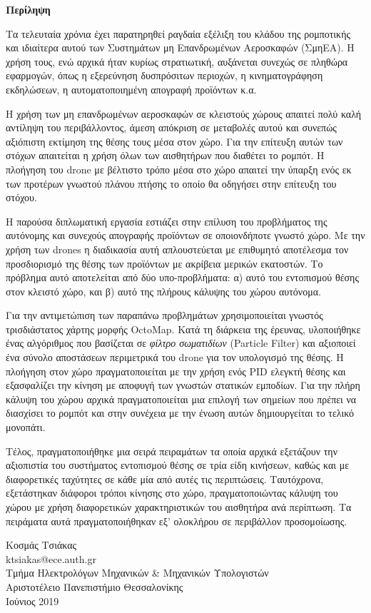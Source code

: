 \begin{center}
  \centering

  \vspace{0.5cm}
  \centering
  \textbf{\Large{Περίληψη}}

  \vspace{1cm}

\end{center}

Τα τελευταία χρόνια έχει παρατηρηθεί ραγδαία εξέλιξη του κλάδου της ρομποτικής και ιδιαίτερα αυτού των Συστημάτων μη Επανδρωμένων Αεροσκαφών (ΣμηΕΑ). Η χρήση τους, ενώ αρχικά ήταν κυρίως στρατιωτική, αυξάνεται συνεχώς σε πληθώρα εφαρμογών, όπως η εξερεύνηση δυσπρόσιτων περιοχών, η κινηματογράφηση εκδηλώσεων, η αυτοματοποιημένη απογραφή προϊόντων κ.α. 

Η χρήση των μη επανδρωμένων αεροσκαφών σε κλειστούς χώρους απαιτεί πολύ καλή αντίληψη του περιβάλλοντος, άμεση απόκριση σε μεταβολές αυτού και συνεπώς αξιόπιστη εκτίμηση της θέσης τους μέσα στον χώρο. Για την επίτευξη αυτών των στόχων απαιτείται η χρήση όλων των αισθητήρων που διαθέτει το ρομπότ. Η πλοήγηση του drone με βέλτιστο τρόπο μέσα στο χώρο απαιτεί την ύπαρξη ενός εκ των προτέρων γνωστού πλάνου πτήσης το οποίο θα οδηγήσει στην επίτευξη του στόχου.

Η παρούσα διπλωματική εργασία εστιάζει στην επίλυση του προβλήματος της αυτόνομης και συνεχούς απογραφής προϊόντων σε οποιονδήποτε γνωστό χώρο. Με την χρήση των drones η διαδικασία αυτή απλουστεύεται με επιθυμητό αποτέλεσμα τον προσδιορισμό της θέσης των προϊόντων με ακρίβεια μερικών εκατοστών. Το πρόβλημα αυτό αποτελείται από δύο υπο-προβλήματα: α) αυτό του εντοπισμού θέσης στον κλειστό χώρο, και β) αυτό της πλήρους κάλυψης του χώρου αυτόνομα.     

Για την αντιμετώπιση των παραπάνω προβλημάτων χρησιμοποιείται γνωστός τρισδιάστατος χάρτης μορφής OctoMap. Κατά τη διάρκεια της έρευνας, υλοποιήθηκε ένας αλγόριθμος που βασίζεται σε \emph{φίλτρο σωματιδίων} (Particle Filter) και αξιοποιεί ένα σύνολο αποστάσεων περιμετρικά του drone για τον υπολογισμό της θέσης. Η πλοήγηση στον χώρο πραγματοποιείται με την χρήση ενός PID ελεγκτή θέσης και εξασφαλίζει την κίνηση με αποφυγή των γνωστών στατικών εμποδίων. Για την πλήρη κάλυψη του χώρου αρχικά πραγματοποιείται μια επιλογή των σημείων που πρέπει να διασχίσει το ρομπότ και στην συνέχεια με την ένωση αυτών δημιουργείται το τελικό μονοπάτι.

Τέλος, πραγματοποιήθηκε μια σειρά πειραμάτων τα οποία αρχικά εξετάζουν την αξιοπιστία του συστήματος εντοπισμού θέσης σε τρία είδη κινήσεων, καθώς και με διαφορετικές ταχύτητες σε κάθε μία από αυτές τις περιπτώσεις. Ταυτόχρονα, εξετάστηκαν διάφοροι τρόποι κίνησης στο χώρο, πραγματοποιώντας κάλυψη του χώρου με χρήση διαφορετικών χαρακτηριστικών του αισθητήρα ανά περίπτωση. Τα πειράματα αυτά πραγματοποιήθηκαν εξ' ολοκλήρου σε περιβάλλον προσομοίωσης.

\begin{flushright}
  \vspace{2cm}
  Κοσμάς Τσιάκας
  \\
  ktsiakas@ece.auth.gr
  \\
  Τμήμα Ηλεκτρολόγων Μηχανικών \& Μηχανικών Υπολογιστών
  \\
  Αριστοτέλειο Πανεπιστήμιο Θεσσαλονίκης
  \\
  Ιούνιος 2019
\end{flushright}
